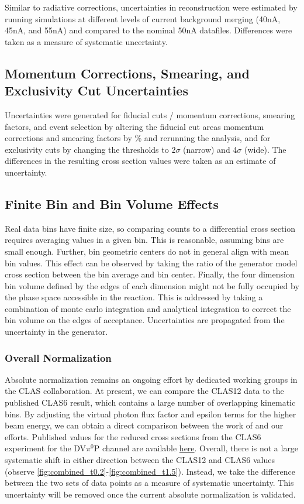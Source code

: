     Similar to radiative corrections, uncertainties in reconstruction were estimated by running simulations at different levels of current background merging (40nA, 45nA, and 55nA) and compared to the nominal 50nA datafiles. Differences were taken as a measure of systematic uncertainty. 

    \subsection*{Momentum Corrections, Smearing, and Exclusivity Cut Uncertainties}
    Uncertainties were generated for fiducial cuts / momentum corrections, smearing factors, and event selection by altering the fiducial cut areas momentum corrections and smearing factors by \% and rerunning the analysis, and for exclusivity cuts by changing the thresholds to 2$\sigma$ (narrow) and 4$\sigma$ (wide). The differences in the resulting cross section values were taken as an estimate of uncertainty. 

    \subsection*{Finite Bin and Bin Volume Effects}
    Real data bins have finite size, so comparing counts to a differential cross section requires averaging values in a given bin. This is reasonable, assuming bins are small enough. Further, bin geometric centers do not in general align with mean bin values. This effect can be observed by taking the ratio of the generator model cross section between the bin average and bin center. Finally, the four dimension bin volume defined by the edges of each dimension might not be fully occupied by the phase space accessible in the reaction. This is addressed by taking a combination of monte carlo integration and analytical integration to correct the bin volume on the edges of acceptance. Uncertainties are propagated from the uncertainty in the generator.     
        
    \subsubsection*{Overall Normalization}

    Absolute normalization remains an ongoing effort by dedicated working groups in the CLAS collaboration. At present, we can compare the CLAS12 data to the published CLAS6 result, which contains a large number of overlapping kinematic bins. By adjusting the virtual photon flux factor and epsilon terms for the higher beam energy, we can obtain a direct comparison between the work of \parencite{Bedlinskiy2014ExclusiveCLAS} and our efforts. Published values for the reduced cross sections from the CLAS6 experiment for the DV$\pi^0$P channel are available \href{https://journals.aps.org/prc/supplemental/10.1103/PhysRevC.90.025205}{here}. Overall, there is not a large systematic shift in either direction between the CLAS12 and CLAS6 values (observe \ref{fig:combined_t0.2}-\ref{fig:combined_t1.5}). Instead, we take the difference between the two sets of data points as a measure of systematic uncertainty. This uncertainty will be removed once the current absolute normalization is validated. 


